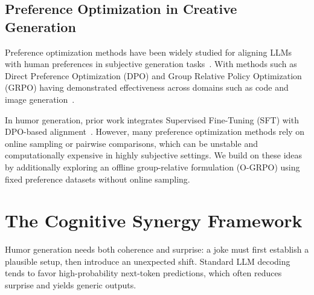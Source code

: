 \documentclass[11pt]{article}
\begin{document}
\subsection{Preference Optimization in Creative Generation}

Preference optimization methods have been widely studied for aligning LLMs with human preferences in subjective generation tasks~\cite{yasuda2025automatic, lou2025sequential, vikhorev2024cleancomedy}. With methods such as Direct Preference Optimization (DPO) and Group Relative Policy Optimization (GRPO) having demonstrated effectiveness across domains such as code and image generation~\cite{govandeteaching, tong2025delving}.

In humor generation, prior work integrates Supervised Fine-Tuning (SFT) with DPO-based alignment~\cite{wang_innovative_2025}. However, many preference optimization methods rely on online sampling or pairwise comparisons, which can be unstable and computationally expensive in highly subjective settings. We build on these ideas by additionally exploring an offline group-relative formulation (O-GRPO) using fixed preference datasets without online sampling.



\section{The Cognitive Synergy Framework}

Humor generation needs both coherence and surprise: a joke must first establish a plausible setup, then introduce an unexpected shift. Standard LLM decoding tends to favor high-probability next-token predictions, which often reduces surprise and yields generic outputs. 
\end{document}

